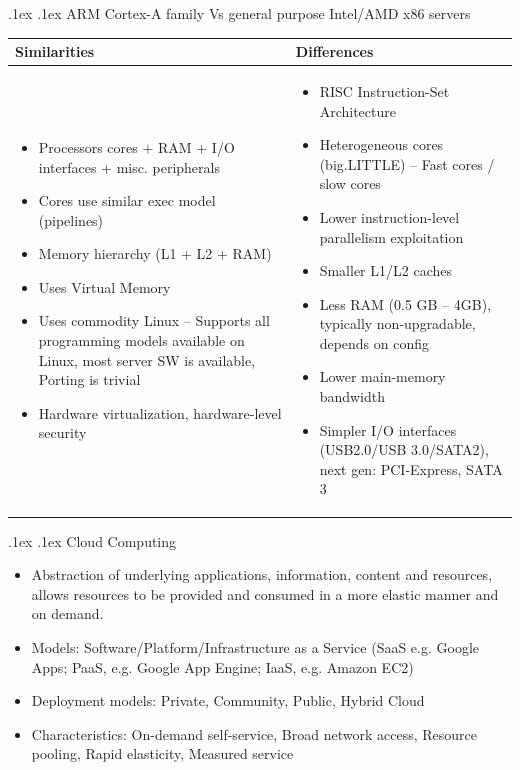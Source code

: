 \documentclass[10pt,landscape,a4paper]{article}
\makeatletter
\renewcommand{\subsection}{\@startsection{subsection}{1}{0mm}%
  {.1ex}%
  {.1ex}%
{\sffamily\bfseries}}
\renewcommand{\subsubsection}{\@startsection{subsubsection}{1}{0mm}%
  {.1ex}%
  {.1ex}%
{\rmfamily\bfseries}}
\makeatother
\begin{document}
\begin{multicols*}{4}
\subsubsection{ARM Cortex-A family Vs general purpose Intel/AMD x86 servers}
\begin{tabularx}{\columnwidth}{X|X}
\textbf{Similarities} & \textbf{Differences} \\ \hline
\begin{itemize}
  \item Processors cores + RAM + I/O interfaces + misc. peripherals
  \item Cores use similar exec model (pipelines)
  \item Memory hierarchy (L1 + L2 + RAM)
  \item Uses Virtual Memory
  \item Uses commodity Linux -- Supports all programming models available on Linux, most server SW is available, Porting is trivial
  \item Hardware virtualization, hardware-level security
\end{itemize} &
\begin{itemize}
  \item RISC Instruction-Set Architecture
  \item Heterogeneous cores (big.LITTLE) -- Fast cores / slow cores
  \item Lower instruction-level parallelism exploitation
  \item Smaller L1/L2 caches
  \item Less RAM (0.5 GB – 4GB), typically non-upgradable, depends on config
  \item Lower main-memory bandwidth
  \item Simpler I/O interfaces (USB2.0/USB 3.0/SATA2), next gen: PCI-Express, SATA 3
\end{itemize}
\end{tabularx}
\subsection{Cloud Computing}
\begin{itemize}
  \item Abstraction of underlying applications, information, content and resources, allows resources to be provided and consumed in a more elastic manner and on demand.
  \item Models: Software/Platform/Infrastructure as a Service (SaaS e.g. Google Apps; PaaS, e.g. Google App Engine; IaaS, e.g. Amazon EC2)
  \item Deployment models: Private, Community, Public, Hybrid Cloud
  \item Characteristics: On-demand self-service, Broad network access, Resource pooling, Rapid elasticity, Measured service
\end{itemize}

\end{multicols*}
\end{document}
